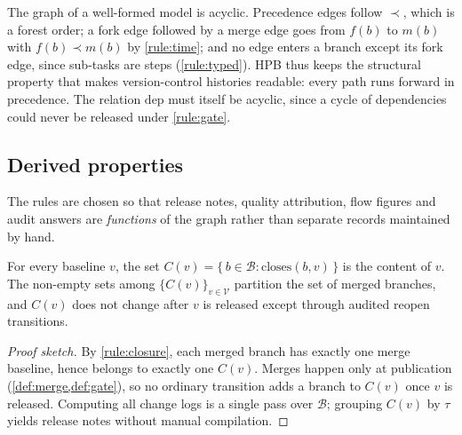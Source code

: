 \begin{remark}
  \label{rem:dag}
  The graph of a well-formed model is acyclic. Precedence edges follow
  $\prec$, which is a forest order; a fork edge followed by a merge edge
  goes from $f(b)$ to $m(b)$ with $f(b) \prec m(b)$ by \cref{rule:time};
  and no edge enters a branch except its fork edge, since sub-tasks are
  steps (\cref{rule:typed}). HPB thus keeps the structural property that
  makes version-control histories readable: every path runs forward in
  precedence. The relation $\mathrm{dep}$ must itself be acyclic, since a
  cycle of dependencies could never be released under \cref{rule:gate}.
\end{remark}

\subsection{Derived properties}
\label{sec:model-properties}

The rules are chosen so that release notes, quality attribution, flow
figures and audit answers are \emph{functions} of the graph rather than
separate records maintained by hand.

\begin{property}
  \label{prop:changelog}
  For every baseline $v$, the set
  $C(v) = \{\, b \in \mathcal{B} : \mathrm{closes}(b, v) \,\}$ is the
  content of $v$. The non-empty sets among $\{C(v)\}_{v \in \mathcal{V}}$
  partition the set of merged branches, and $C(v)$ does not change after
  $v$ is released except through audited reopen transitions.
\end{property}
\begin{proof}[Proof sketch]
  By \cref{rule:closure}, each merged branch has exactly one merge baseline,
  hence belongs to exactly one $C(v)$. Merges happen only at publication
  (\cref{def:merge,def:gate}), so no ordinary transition adds a branch to
  $C(v)$ once $v$ is released. Computing all change logs is a single pass
  over $\mathcal{B}$; grouping $C(v)$ by $\tau$ yields release notes
  without manual compilation.
\end{proof}

